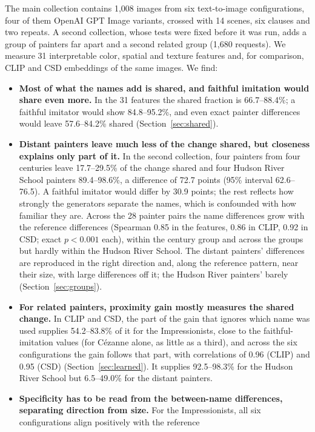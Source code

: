 \documentclass[10pt]{article}
\begin{document}
The main collection contains 1,008 images from six text-to-image configurations, four of them
OpenAI GPT Image variants, crossed with 14 scenes, six clauses and two repeats. A second
collection, whose tests were fixed before it was run, adds a group of painters far apart and a
second related group (1,680 requests). We measure 31 interpretable color, spatial and texture
features and, for comparison, CLIP \citep{radford2021} and CSD \citep{somepalli2024style}
embeddings of the same images. We find:
\begin{itemize}
\item \textbf{Most of what the names add is shared, and faithful imitation would share even
more.} In the 31 features the shared fraction is 66.7--88.4\%; a faithful imitator would show
84.8--95.2\%, and even exact painter differences would leave 57.6--84.2\% shared
(Section~\ref{sec:shared}).
\item \textbf{Distant painters leave much less of the change shared, but closeness explains only
part of it.} In the second collection, four painters from four centuries leave 17.7--29.5\% of the
change shared and four Hudson River School painters 89.4--98.6\%, a difference of 72.7 points (95\%
interval 62.6--76.5). A faithful imitator would differ by 30.9 points; the rest reflects how
strongly the generators separate the names, which is confounded with how familiar they are. Across
the 28 painter pairs the name differences grow with the reference differences (Spearman 0.85 in the
features, 0.86 in CLIP, 0.92 in CSD; exact $p<0.001$ each), within the century group and across the
groups but hardly within the Hudson River School. The distant painters' differences are reproduced
in the right direction and, along the reference pattern, near their size, with large differences
off it; the Hudson River painters' barely (Section~\ref{sec:groups}).
\item \textbf{For related painters, proximity gain mostly measures the shared change.} In CLIP and
CSD, the part of the gain that ignores which name was used supplies 54.2--83.8\% of it for the
Impressionists, close to the faithful-imitation values (for C\'ezanne alone, as little as a
third), and across the six configurations the gain follows that part, with correlations of 0.96
(CLIP) and 0.95 (CSD) (Section~\ref{sec:learned}). It supplies 92.5--98.3\% for the Hudson River
School but 6.5--49.0\% for the distant painters.
\item \textbf{Specificity has to be read from the between-name differences, separating direction
from size.} For the Impressionists, all six configurations align positively with the reference

\end{itemize}
\end{document}
